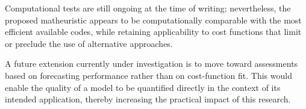 \documentclass[runningheads]{llncs}
\begin{document}
Computational tests are still ongoing at the time of writing; nevertheless, the proposed matheuristic appears to be computationally comparable with the most efficient available codes, while retaining applicability to cost functions that limit or preclude the use of alternative approaches.

A future extension currently under investigation is to move toward assessments based on forecasting performance rather than on cost-function fit. This would enable the quality of a model to be quantified directly in the context of its intended application, thereby increasing the practical impact of this research.



\end{document}
